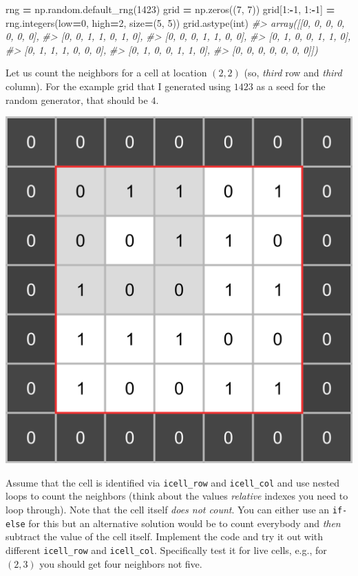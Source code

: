 \documentclass[
]{book}
\newenvironment{Shaded}{\begin{snugshade}}{\end{snugshade}}
\newcommand{\BuiltInTok}[1]{#1}
\newcommand{\CommentTok}[1]{\textcolor[rgb]{0.56,0.35,0.01}{\textit{#1}}}
\newcommand{\DecValTok}[1]{\textcolor[rgb]{0.00,0.00,0.81}{#1}}
\newcommand{\NormalTok}[1]{#1}
\newcommand{\OperatorTok}[1]{\textcolor[rgb]{0.81,0.36,0.00}{\textbf{#1}}}
\begin{document}
\begin{Shaded}
\begin{Highlighting}[]
\NormalTok{rng }\OperatorTok{=}\NormalTok{ np.random.default\_rng(}\DecValTok{1423}\NormalTok{)}
\NormalTok{grid }\OperatorTok{=}\NormalTok{ np.zeros((}\DecValTok{7}\NormalTok{, }\DecValTok{7}\NormalTok{))}
\NormalTok{grid[}\DecValTok{1}\NormalTok{:}\OperatorTok{{-}}\DecValTok{1}\NormalTok{, }\DecValTok{1}\NormalTok{:}\OperatorTok{{-}}\DecValTok{1}\NormalTok{] }\OperatorTok{=}\NormalTok{ rng.integers(low}\OperatorTok{=}\DecValTok{0}\NormalTok{, high}\OperatorTok{=}\DecValTok{2}\NormalTok{, size}\OperatorTok{=}\NormalTok{(}\DecValTok{5}\NormalTok{, }\DecValTok{5}\NormalTok{))}
\NormalTok{grid.astype(}\BuiltInTok{int}\NormalTok{)}
\CommentTok{\#\textgreater{} array([[0, 0, 0, 0, 0, 0, 0],}
\CommentTok{\#\textgreater{}        [0, 0, 1, 1, 0, 1, 0],}
\CommentTok{\#\textgreater{}        [0, 0, 0, 1, 1, 0, 0],}
\CommentTok{\#\textgreater{}        [0, 1, 0, 0, 1, 1, 0],}
\CommentTok{\#\textgreater{}        [0, 1, 1, 1, 0, 0, 0],}
\CommentTok{\#\textgreater{}        [0, 1, 0, 0, 1, 1, 0],}
\CommentTok{\#\textgreater{}        [0, 0, 0, 0, 0, 0, 0]])}
\end{Highlighting}
\end{Shaded}

Let us count the neighbors for a cell at location \((2, 2)\) (so, \emph{third} row and \emph{third} column). For the example grid that I generated using \(1423\) as a seed for the random generator, that should be \(4\).

\begin{center}\includegraphics[width=0.5\linewidth]{images/game-of-life-neighbors} \end{center}

Assume that the cell is identified via \texttt{icell\_row} and \texttt{icell\_col} and use nested loops to count the neighbors (think about the values \emph{relative} indexes you need to loop through). Note that the cell itself \emph{does not count}. You can either use an \texttt{if-else} for this but an alternative solution would be to count everybody and \emph{then} subtract the value of the cell itself. Implement the code and try it out with different \texttt{icell\_row} and \texttt{icell\_col}. Specifically test it for live cells, e.g., for \((2, 3)\) you should get four neighbors not five.
\end{document}
